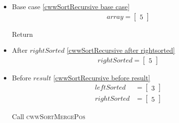 \begin{frame}[containsverbatim]{\cwwalgortihmexampleframe}
\begin{columns}[c]
\begin{column}{0.65\textwidth}
{\begin{minipage}[c]{\textwidth}
\begin{multicols}{3}
\begin{itemize}
                                    Call \textsc{cwwSortRecursive}
        
                                    \item Base case \cref{cwwSortRecursive base case}
                                    \begin{align*}
                                        array = \begin{bmatrix}5\end{bmatrix}
                                    \end{align*}
        
                                    Return
        
                                    \item After $rightSorted$ \cref{cwwSortRecursive after rightsorted}
                                    \begin{align*}
                                        rightSorted = \begin{bmatrix}5\end{bmatrix}
                                    \end{align*}
        
                                    \item Before $result$ \cref{cwwSortRecursive before result}
                                    \begin{align*}
                                        leftSorted & = \begin{bmatrix}3\end{bmatrix} \\
                                        rightSorted & = \begin{bmatrix}5\end{bmatrix}
                                    \end{align*}
        
                                    Call \textsc{cwwSortMergePos}
                                \end{itemize}
                            \end{multicols}
                        \end{minipage}
                    }
                \end{column}
            \end{columns}
        \end{frame}

